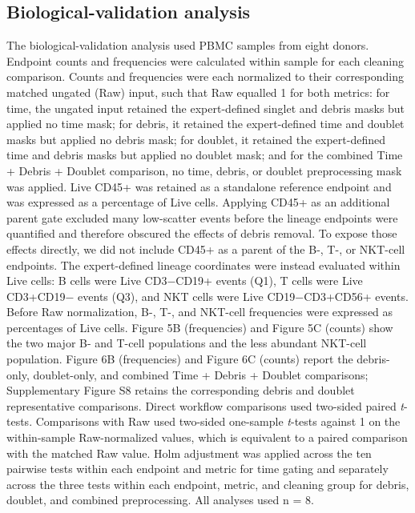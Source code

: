\documentclass[ASNA]{latex/wiley/USG}
\begin{document}
\subsection{Biological-validation
analysis}\label{biological-validation-analysis}

The biological-validation analysis used PBMC samples from eight donors.
Endpoint counts and frequencies were calculated within sample for each
cleaning comparison. Counts and frequencies were each normalized to
their corresponding matched ungated (Raw) input, such that Raw equalled
1 for both metrics: for time, the ungated input retained the
expert-defined singlet and debris masks but applied no time mask; for
debris, it retained the expert-defined time and doublet masks but
applied no debris mask; for doublet, it retained the expert-defined time
and debris masks but applied no doublet mask; and for the combined Time
+ Debris + Doublet comparison, no time, debris, or doublet preprocessing
mask was applied. Live CD45+ was retained as a standalone reference
endpoint and was expressed as a percentage of Live cells. Applying CD45+
as an additional parent gate excluded many low-scatter events before the
lineage endpoints were quantified and therefore obscured the effects of
debris removal. To expose those effects directly, we did not include
CD45+ as a parent of the B-, T-, or NKT-cell endpoints. The
expert-defined lineage coordinates were instead evaluated within Live
cells: B cells were Live CD3−CD19+ events (Q1), T cells were Live
CD3+CD19− events (Q3), and NKT cells were Live CD19−CD3+CD56+ events.
Before Raw normalization, B-, T-, and NKT-cell frequencies were
expressed as percentages of Live cells. Figure 5B (frequencies) and
Figure 5C (counts) show the two major B- and T-cell populations and the
less abundant NKT-cell population. Figure 6B (frequencies) and Figure 6C
(counts) report the debris-only, doublet-only, and combined Time +
Debris + Doublet comparisons; Supplementary Figure S8 retains the
corresponding debris and doublet representative comparisons. Direct
workflow comparisons used two-sided paired \emph{t}-tests. Comparisons
with Raw used two-sided one-sample \emph{t}-tests against 1 on the
within-sample Raw-normalized values, which is equivalent to a paired
comparison with the matched Raw value. Holm adjustment was applied
across the ten pairwise tests within each endpoint and metric for time
gating and separately across the three tests within each endpoint,
metric, and cleaning group for debris, doublet, and combined
preprocessing. All analyses used n = 8.
\end{document}
